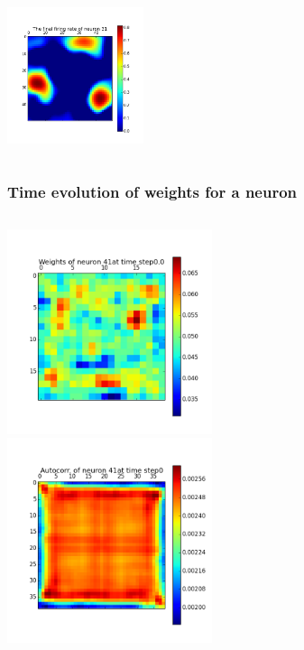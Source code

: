 \begin{frame}
\begin{columns}[t]
\includegraphics[width=4cm,height=4cm]{neurons/neuron_r_31.png}
\end{columns}
\end{frame}


\begin{frame}
\frametitle{Time evolution of weights for a neuron}
\begin{columns}[t]
\centering
\includegraphics[width=6cm,height=6cm]{neurons/neuron_w_41_t_0.png}\\
\centering
\includegraphics[width=6cm,height=6cm]{neurons/neuron_a_41_t_0.png}\\
\end{columns}
\end{frame}

